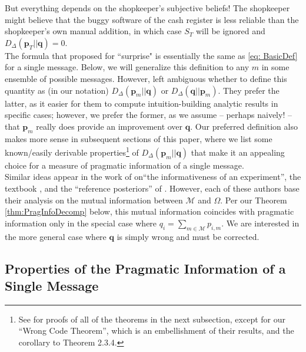 \documentclass[11pt]{article}
\begin{document}
But everything depends on the shopkeeper's subjective beliefs!  The shopkeeper might believe that the buggy software of the cash register is less reliable than the shopkeeper's own manual addition, in which case $S_T$ will be ignored  and $D_\Delta(\mathbf p_T || \mathbf q) = 0$.\\

The formula that \cite{wow} proposed for ``surprise" is essentially the same as \eqref{eq: BasicDef} for a single message.  Below, we will generalize this definition to any $m$ in some ensemble of possible messages.  However, \cite{wow} left ambiguous whether to define this quantity as (in our notation) $D_\Delta(\mathbf p_m || \mathbf q)$ or $D_\Delta(\mathbf q || \mathbf p_m)$.  They prefer the latter, as it easier for them to compute intuition-building analytic results in specific cases; however, we prefer the former, as we assume -- perhaps naively! -- that $\mathbf p_m$ really does provide an improvement over $\mathbf q$.  Our preferred definition also makes more sense in subsequent sections of this paper, where we list some known/easily derivable properties\footnote{See \cite{CoverAndThomas} for proofs of all of the theorems in the next subsection, except for our ``Wrong Code Theorem'', which is an embellishment of their results, and the corollary to Theorem 2.3.4.} of $D_\Delta(\mathbf p_m || \mathbf q)$ that make it an appealing choice for a measure of pragmatic information of a single message.\\

Similar ideas appear in the work of \cite{Lindley} on``the informativeness of an experiment'', the textbook 
\cite{deGroot}, and the ``reference posteriors'' of \cite{Bernardo}.  However, each of these authors base 
their analysis on the mutual information between $\mathcal M$ and $\Omega$.  Per our Theorem 
\ref{thm:PragInfoDecomp} below, this mutual information coincides with pragmatic information only in 
the special case where $q_i = \sum_{m \in \mathcal M} p_{i,m}$.  We are interested in the more general 
case where $\mathbf q$ is simply wrong and must be corrected.

\subsection{Properties of the Pragmatic Information of a Single Message}
\end{document}
